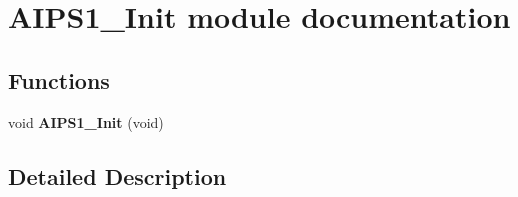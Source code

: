 \hypertarget{group___a_i_p_s1___init__module}{}\section{A\+I\+P\+S1\+\_\+\+Init module documentation}
\label{group___a_i_p_s1___init__module}
\subsection*{Functions}
\begin{DoxyCompactItemize}
\item 
void {\bfseries A\+I\+P\+S1\+\_\+\+Init} (void)\hypertarget{group___a_i_p_s1___init__module_gadaefcfa3d01c5ee78a2652d653f4e295}{}\label{group___a_i_p_s1___init__module_gadaefcfa3d01c5ee78a2652d653f4e295}

\end{DoxyCompactItemize}


\subsection{Detailed Description}
